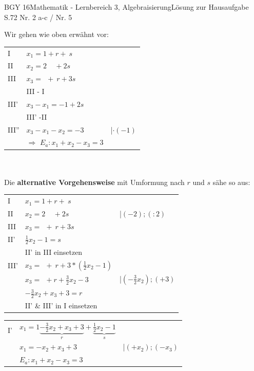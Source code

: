 \documentclass[oneside,openany,headings=optiontotoc,11pt,numbers=noenddot]{scrreprt}
\begin{document}
\begin{worksheet}{BGY 16}{Mathematik - Lernbereich 3, Algebraisierung}{Lösung zur Hausaufgabe S.72 Nr. 2 a-c / Nr. 5}
\begin{framed}
			Wir gehen wie oben erwähnt vor:\\
			\begin{tabularx}{\textwidth}{lll}
				I & \(x_1 = 1 + r + \ s\)\\
				II & \(x_2 = 2\ \ \ \ \ + 2s\)\\
				III& \(x_3 =\ \ +\ r+ 3s\)\\
				\hline
				& III - I\\
				III' & \(x_3 -x_1 = -1 + 2s\)\\
				& III' -II\\
				III'' & \(x_3 - x_1 - x_2 = -3\) & |\(\cdot (-1)\)\\
				& \(\Rightarrow\) \colorbox{green!10}{\(E_a: x_1 + x_2 - x_3 = 3\)}\\
			\end{tabularx}\\
			\hdashrule[0.5ex][x]{\textwidth}{0.1mm}{2mm 6pt}\\
			Die \textbf{alternative Vorgehensweise} mit Umformung nach \(r\) und \(s\) sähe so aus:\\
			\begin{tabularx}{\textwidth}{lll}
				I & \(x_1 = 1 + r + \ s\)\\
				II & \(x_2 = 2\ \ \ \ \ + 2s\) & |\((-2); (:2)\)\\
				III& \(x_3 =\ \ +\ r+ 3s\)\\
				\hline
				II'& \(\frac{1}{2}x_2 - 1 = s\)\\
				& \multicolumn{2}{l}{II' in III einsetzen}\\
				III' & \(x_3 =\ \ +\ r+ 3*(\frac{1}{2}x_2 - 1)\)\\
				& \(x_3 =\ \ + r + \frac{3}{2}x_2 - 3\) & |\((-\frac{3}{2}x_2); (+3)\)\\
				& \(-\frac{3}{2}x_2 + x_3 + 3 = r\)\\
				& \multicolumn{2}{l}{II' \& III' in I einsetzen}\\
			\end{tabularx}
			\begin{tabularx}{\textwidth}{lll}
				I' & \(x_1 = 1 \underbrace{-\frac{3}{2}x_2 + x_3 + 3}_{r} + \underbrace{\frac{1}{2}x_2 - 1}_{s}\)\\
				& \(x_1 = -x_2 + x_3 +3\) & |\((+x_2);(-x_3)\)\\
				& \colorbox{green!10}{\(E_a: x_1 + x_2 - x_3 = 3\)}
			\end{tabularx}\\
			\par

\end{framed}
\end{worksheet}
\end{document}
